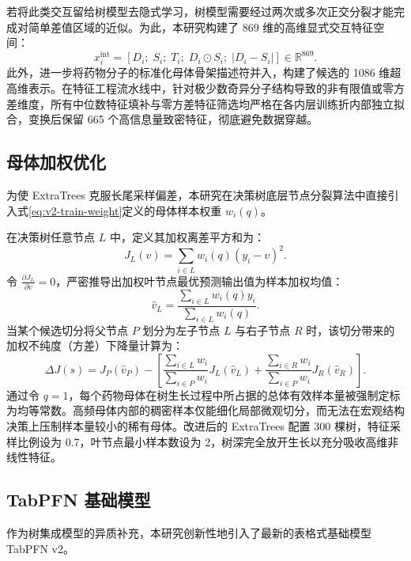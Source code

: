 若将此类交互留给树模型去隐式学习，树模型需要经过两次或多次正交分裂才能完成对简单差值区域的近似。为此，本研究构建了 869 维的高维显式交互特征空间：
\begin{equation}
x_i^{\mathrm{int}} = \left[ D_i;\; S_i;\; T_i;\; D_i \odot S_i;\; |D_i - S_i| \right] \in \mathbb{R}^{869}.
\end{equation}
此外，进一步将药物分子的标准化母体骨架描述符并入，构建了候选的 1086 维超高维表示。在特征工程流水线中，针对极少数奇异分子结构导致的非有限值或零方差维度，所有中位数特征填补与零方差特征筛选均严格在各内层训练折内部独立拟合，变换后保留 665 个高信息量致密特征，彻底避免数据穿越。

\subsection{母体加权优化}

为使 ExtraTrees 克服长尾采样偏差，本研究在决策树底层节点分裂算法中直接引入式\eqref{eq:v2-train-weight}定义的母体样本权重 $w_i(q)$。

在决策树任意节点 $L$ 中，定义其加权离差平方和为：
\begin{equation}
J_L(v) = \sum_{i \in L} w_i(q) (y_i - v)^2.
\end{equation}
令 $\frac{\partial J_L}{\partial v} = 0$，严密推导出加权叶节点最优预测输出值为样本加权均值：
\begin{equation}
\widehat v_L = \frac{\sum_{i \in L} w_i(q) y_i}{\sum_{i \in L} w_i(q)}.
\end{equation}
当某个候选切分将父节点 $P$ 划分为左子节点 $L$ 与右子节点 $R$ 时，该切分带来的加权不纯度（方差）下降量计算为：
\begin{equation}
\Delta J(s) = J_P(\widehat v_P) - \left[ \frac{\sum_{i \in L} w_i}{\sum_{i \in P} w_i} J_L(\widehat v_L) + \frac{\sum_{i \in R} w_i}{\sum_{i \in P} w_i} J_R(\widehat v_R) \right].
\end{equation}
通过令 $q=1$，每个药物母体在树生长过程中所占据的总体有效样本量被强制定标为均等常数。高频母体内部的稠密样本仅能细化局部微观切分，而无法在宏观结构决策上压制样本量较小的稀有母体。改进后的 ExtraTrees 配置 300 棵树，特征采样比例设为 0.7，叶节点最小样本数设为 2，树深完全放开生长以充分吸收高维非线性特征。

\subsection{TabPFN 基础模型}

作为树集成模型的异质补充，本研究创新性地引入了最新的表格式基础模型 TabPFN v2\cite{tabpfn2025}。

